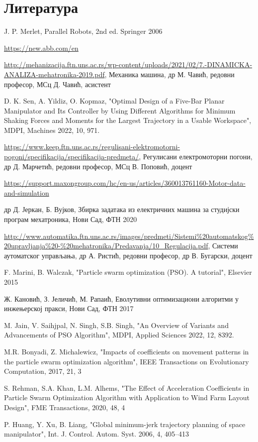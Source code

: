 \documentclass[12pt]{article}
\begin{document}
\newpage
\section{Литература}
\begin{enumerate}[start=1,label={[\arabic*]}]
\item J. P. Merlet, Parallel Robots, 2nd ed. Springer 2006
\item \url{https://new.abb.com/en}
\item \url{http://mehanizacija.ftn.uns.ac.rs/wp-content/uploads/2021/02/7.-DINAMICKA-ANALIZA-mehatronika-2019.pdf}, Механика машина, др М. Чавић, редовни професор, МСц Д. Чавић, асистент
\item D. K. Sen, A. Yildiz, O. Kopmaz, "Optimal Design of a Five-Bar Planar Manipulator and Its
Controller by Using Different Algorithms for Minimum
Shaking Forces and Moments for the Largest Trajectory in a
Usable Workspace", MDPI, Machines 2022, 10, 971.
\item \url{https://www.keep.ftn.uns.ac.rs/regulisani-elektromotorni-pogoni/specifikacija/specifikacija-predmeta/}, Регулисани електромоторни погони, др Д. Марчетић, редовни професор, МСц В. Поповић, доцент
\item \url{https://support.maxongroup.com/hc/en-us/articles/360013761160-Motor-data-and-simulation}
\item др Д. Јеркан, Б. Вујков, Збирка задатака из електричних машина за студијски програм мехатроника, Нови Сад, ФТН 2020
\item \url{http://www.automatika.ftn.uns.ac.rs/images/predmeti/Sistemi%20automatskog%20upravljanja%20-%20mehatronika/Predavanja/10_Regulacija.pdf}, Системи аутоматског управљања,
др А. Ристић, редовни професор, др В. Бугарски, доцент
\item F. Marini, B. Walczak, "Particle swarm optimization (PSO). A tutorial", Elsevier 2015
\item Ж. Кановић, З. Јеличић, М. Рапаић, Еволутивни оптимизациони алгоритми у инжењерској пракси, Нови Сад, ФТН 2017
\item M. Jain, V. Saihjpal, N. Singh, S.B. Singh, "An Overview of Variants and Advancements of PSO Algorithm", MDPI, Applied Sciences 2022, 12, 8392.
\item M.R. Bonyadi, Z. Michalewicz, "Impacts of coefficients on movement patterns in the particle swarm optimization algorithm", IEEE Transactions on Evolutionary Computation, 2017, 21, 3
\item S. Rehman, S.A. Khan, L.M. Alhems, "The Effect of Acceleration Coefficients in Particle Swarm Optimization Algorithm with Application to Wind Farm Layout Design", FME Transactions, 2020, 48, 4
\item P. Huang, Y. Xu, B. Liang, "Global minimum-jerk trajectory planning of space manipulator", Int. J. Control. Autom. Syst. 2006, 4, 405–413
\end{enumerate}
\end{document}
